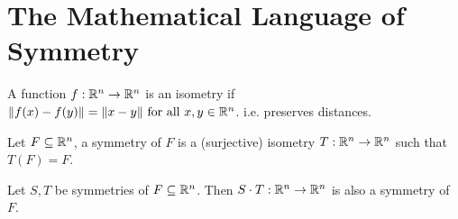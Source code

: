 \section{The Mathematical Language of Symmetry}

\begin{definition}[Isometry]
    A function \(f: \mathbb{R}^n \to \mathbb{R}^n\) is an isometry if \(\norm{f(x) - f(y)} = \norm{x - y} \text{ for all } x, y \in \mathbb{R}^n\). i.e. preserves distances.
\end{definition}

\begin{definition}[Symmetry]
    Let \(F \subseteq \mathbb{R}^n\), a symmetry of \(F\) is a (surjective) isometry \(T : \mathbb{R}^n \to \mathbb{R}^n\) such that \(T(F) = F\).
\end{definition}

\begin{properties}
    Let \(S, T\) be symmetries of \(F \subseteq \mathbb{R}^n\). Then \(S \cdot T : \mathbb{R}^n \to \mathbb{R}^n\) is also a symmetry of \(F\).
\end{properties}


